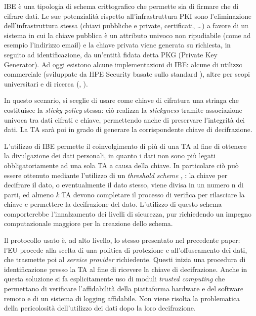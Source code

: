 IBE \cite{shamir1984identity} \`e una tipologia di schema crittografico che permette sia di firmare che di cifrare dati. Le sue potenzialit\`a rispetto all’infrastruttura PKI sono l’eliminazione dell’infrastruttura stessa (chiavi pubbliche e private, certificati, …) a favore di un sistema in cui la chiave pubblica \`e un attributo univoco non ripudiabile (come ad esempio l’indirizzo email) e la chiave privata viene generata su richiesta, in seguito ad identificazione, da un’entit\`a fidata detta PKG (Private Key Generator).
Ad oggi esistono alcune implementazioni di IBE: alcune di utilizzo commerciale (sviluppate da HPE Security \cite{IBEimplVoltage} basate sullo standard \cite{boyen2007identity}), altre per scopi universitari e di ricerca (\cite{Lynn2013}, \cite{ducas2016}).

In questo scenario, si sceglie di usare come chiave di cifratura una stringa che costituisce la \textit{sticky policy} stessa: ci\`o realizza la \textit{stickyness} tramite associazione univoca tra dati cifrati e chiave, permettendo anche di preservare l’integrit\`a dei dati. La TA sar\`a poi in grado di generare la corrispondente chiave di decifrazione.

L’utilizzo di IBE permette il coinvolgimento di pi\`u di una TA al fine di ottenere la divulgazione dei dati personali, in quanto i dati non sono pi\`u legati obbligatoriamente ad una sola TA a causa della chiave. In particolare ci\`o può essere ottenuto mediante l’utilizzo di un \textit{threshold scheme} \cite{shamir1979scheme}, \cite{sahai2005fuzzy}: la chiave per decifrare il dato, o eventualmente il dato stesso, viene divisa in un numero n di parti, ed almeno \textit{k} TA devono completare il processo di verifica per rilasciare la chiave e permettere la decifrazione del dato. L’utilizzo di questo schema comporterebbe l’innalzamento dei livelli di sicurezza, pur richiedendo un impegno computazionale maggiore per la creazione dello schema.

Il protocollo usato \`e, ad alto livello, lo stesso presentato nel precedente paper: l’EU procede alla scelta di una politica di protezione e all’offuscamento dei dati, che trasmette poi al \textit{service provider} richiedente. Questi inizia una procedura di identificazione presso la TA al fine di ricevere la chiave di decifrazione. Anche in questa soluzione si fa esplicitamente uso di moduli \textit{trusted computing} che permettano di verificare l’affidabilit\`a della piattaforma hardware e del software remoto e di un sistema di logging affidabile. Non viene risolta la problematica della pericolosit\`a dell’utilizzo dei dati dopo la loro decifrazione.

